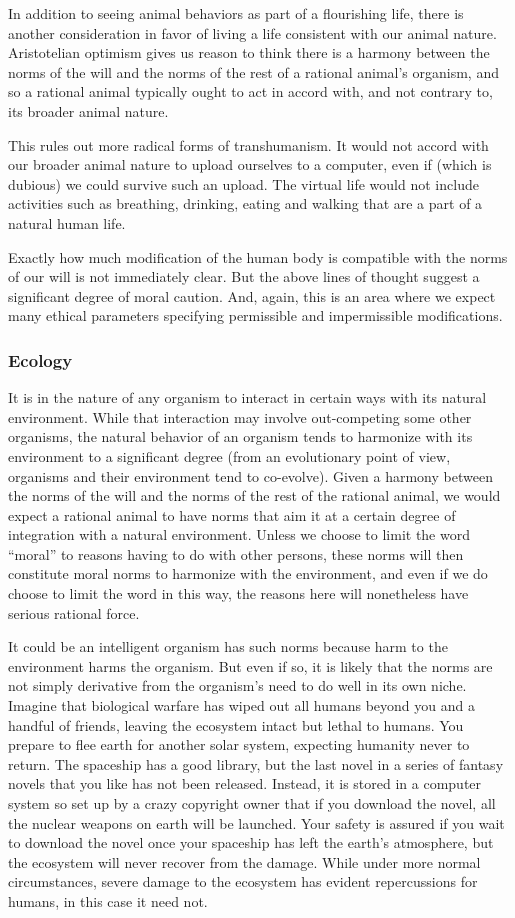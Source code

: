 In addition to seeing animal behaviors as part of a flourishing life, there is another consideration in favor of 
living a life consistent with our animal nature. Aristotelian optimism gives us reason to think there is a harmony between 
the norms of the will and the norms of the rest of a rational animal's organism, and so a rational animal typically ought to act in 
accord with, and not contrary to, its broader animal nature. 

This rules out more radical forms of transhumanism. It would not accord with our broader animal nature to upload ourselves to a computer,
even if (which is dubious) we could survive such an upload. The virtual life would not include 
activities such as breathing, drinking, eating and walking that are a part of a natural human life.

Exactly how much modification of the human body is compatible with the norms of our will is not immediately clear. But the above
lines of thought suggest a significant degree of moral caution. And, again, this is an area where we expect many ethical parameters specifying
permissible and impermissible modifications.

\subsubsection{Ecology}
It is in the nature of any organism to interact in certain ways with its natural environment. While that interaction may 
involve out-competing some other organisms, the natural behavior of an organism tends to 
harmonize with its environment to a significant degree (from an evolutionary point of view, organisms and their environment tend 
to co-evolve). Given a harmony between the norms of the will and the norms of the rest of the rational animal, we would expect 
a rational animal to have norms that aim it at a certain degree of integration with a natural environment. 
Unless we choose to limit the word ``moral'' to reasons having to do with other persons, these norms will then
constitute moral norms to harmonize with the environment, and even if we do choose to limit the word in this way,
the reasons here will nonetheless have serious rational force.

It could be an intelligent organism has such norms because harm to the environment harms the organism.
But even if so, it is likely that the norms are not simply derivative from the organism's need to do well in its own 
niche. Imagine that biological warfare has wiped out all humans beyond you and a handful of friends, leaving the ecosystem 
intact but lethal to humans. You prepare to flee earth for another solar system, expecting humanity never to return. 
The spaceship has a good library, but the last novel in a series of fantasy novels that you like has not been released.
Instead, it is stored in a computer system so set up by a crazy copyright owner that if you download the novel, all the 
nuclear weapons on earth will be launched. Your safety is assured if you wait to download the novel once your spaceship has 
left the earth's atmosphere, but the ecosystem will never recover from the damage. While under more normal circumstances,
severe damage to the ecosystem has evident repercussions for humans, in this case it need not. 

